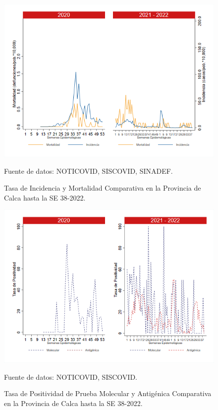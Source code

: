 \documentclass[12pt,a4paper,openany]{book}
\begin{document}
	\begin{figure}[h]
		\caption{Tasa de Incidencia y Mortalidad Comparativa en la Provincia de Calca hasta la SE 38-2022.}\label{fig:inc_mort_calca}
		\begin{center}
			\includegraphics[width=0.85\linewidth]{../figuras/incidencia_mortalidad_20_21_3.png}
		\end{center}
		{\footnotesize {Fuente de datos: NOTICOVID, SISCOVID, SINADEF.}}
	\end{figure}
	
	\begin{figure}[h]
		\caption{Tasa de Positividad de Prueba Molecular y Antigénica Comparativa en la Provincia de Calca hasta la SE 38-2022.}\label{fig:positividad_calca}
		\begin{center}
			\includegraphics[width=0.7\linewidth]{../figuras/positividad_20_21_3.png}
		\end{center}
		{\footnotesize {Fuente de datos: NOTICOVID, SISCOVID.}}
	\end{figure}
	
\end{document}

